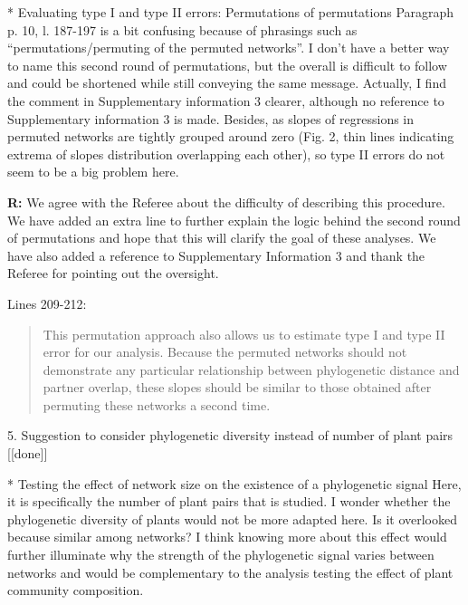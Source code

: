 \documentclass[12pt]{letter}
\newenvironment{refquote}{\bigskip \begin{it}}{\end{it}\smallskip}
\begin{document}
		\begin{refquote}
			* Evaluating type I and type II errors: Permutations of permutations
			Paragraph p. 10, l. 187-197 is a bit confusing because of phrasings such as “permutations/permuting of the permuted networks”. I don't have a better way to name this second round of permutations, but the overall is difficult to follow and could be shortened while still conveying the same message.
			Actually, I find the comment in Supplementary information 3 clearer, although no reference to Supplementary information 3 is made.
			Besides, as slopes of regressions in permuted networks are tightly grouped around zero (Fig. 2, thin lines indicating 
			extrema of slopes distribution overlapping each other), so type II errors do not seem to be a big problem here.
		\end{refquote}


		\textbf{R:} We agree with the Referee about the difficulty of describing this procedure. We have added an extra line to further explain the logic behind the second round of permutations and hope that this will clarify the goal of these analyses. We have also added a reference to Supplementary Information 3 and thank the Referee for pointing out the oversight.


		Lines 209-212:

		\begin{quotation}

			This permutation approach also allows us to estimate type I and type II 
			error for our analysis. Because the permuted networks should not demonstrate any particular relationship between phylogenetic distance and partner overlap, these slopes should be similar to those obtained after permuting these networks a second time.

		\end{quotation}


	5. Suggestion to consider phylogenetic diversity instead of number of plant pairs [[done]]

		\begin{refquote}
			* Testing the effect of network size on the existence of a phylogenetic signal
			Here, it is specifically the number of plant pairs that is studied. I wonder whether the phylogenetic diversity of plants would not be more adapted here. Is it overlooked because similar among networks?
			I think knowing more about this effect would further illuminate why the strength of the phylogenetic signal varies between networks and would be complementary to the analysis testing the effect of plant community composition.
		\end{refquote}
\end{document}
